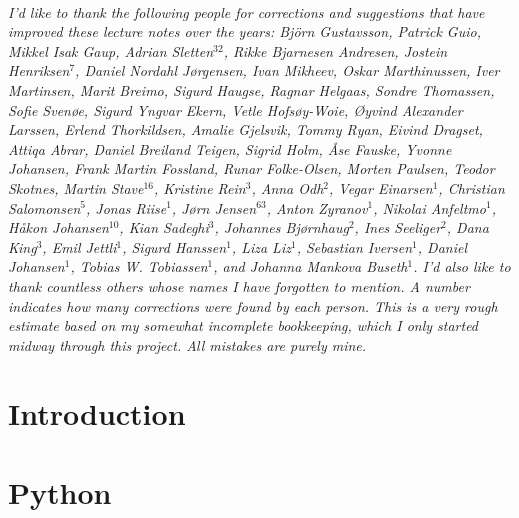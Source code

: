 \documentclass{tufte-book}
\begin{document}
\cleardoublepage
~\vfill
\begin{doublespace}
\noindent\fontsize{10}{10}\selectfont\itshape
\nohyphenation
I'd like to thank the following people for corrections and suggestions
that have improved these lecture notes over the years: Björn
Gustavsson, Patrick Guio,
Mikkel Isak Gaup, Adrian Sletten$^{32}$,
Rikke Bjarnesen Andresen, Jostein Henriksen$^7$, Daniel Nordahl Jørgensen,
Ivan Mikheev, Oskar Marthinussen, Iver Martinsen, Marit Breimo, Sigurd
Haugse, Ragnar Helgaas, Sondre Thomassen, Sofie Svenøe, Sigurd Yngvar
Ekern, Vetle Hofsøy-Woie, Øyvind Alexander Larssen, Erlend
Thorkildsen, Amalie Gjelsvik, Tommy Ryan, Eivind Dragset, Attiqa
Abrar, Daniel Breiland Teigen, Sigrid Holm, Åse Fauske, Yvonne
Johansen, Frank Martin Fossland, Runar Folke-Olsen, Morten Paulsen,
Teodor Skotnes,
Martin Stave$^{16}$, Kristine Rein$^{3}$, Anna Odh$^{2}$, Vegar
Einarsen$^{1}$, Christian Salomonsen$^{5}$, Jonas Riise$^{1}$, Jørn
Jensen$^{63}$, Anton Zyranov$^{1}$, Nikolai Anfeltmo$^{1}$, Håkon
Johansen$^{10}$, Kian Sadeghi$^{3}$, Johannes Bjørnhaug$^{2}$, Ines
Seeliger$^{2}$, Dana King$^{3}$, Emil Jettli$^{1}$, Sigurd
Hanssen$^{1}$, Liza Liz$^{1}$, Sebastian Iversen$^{1}$, Daniel
Johansen$^{1}$, Tobias W. Tobiassen$^{1}$, and Johanna Mankova
Buseth$^{1}$. I'd also like to thank countless others whose names I
have forgotten to mention. A number indicates how many corrections were
found by each person. This is a very rough estimate based on my
somewhat incomplete bookkeeping, which I only started midway through
this project. All mistakes are purely mine.
\end{doublespace}
\vfill
\vfill





\cleardoublepage


\ifSpIntro
\chapter{Introduction}

\fi

\ifSpPython
\chapter{Python} 



\fi
\end{document}
